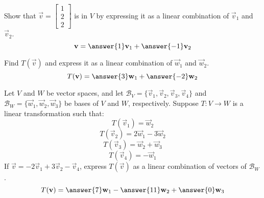 \documentclass{ximera}
\begin{document}
\begin{problem}
  \begin{problem}\label{prob:lintransandbasis2}
  Show that $\vec{v}=\begin{bmatrix}1\\2\\2\end{bmatrix}$ is in $V$ by expressing it as a linear combination of $\vec{v}_1$ and $\vec{v}_2$.
  $$\vec{v}=\answer{1}\vec{v}_1+\answer{-1}\vec{v}_2$$
  \end{problem}
  
  \begin{problem}\label{prob:lintransandbasis3}
  Find $T(\vec{v})$ and express it as a linear combination of $\vec{w}_1$ and $\vec{w}_2$.
  $$T(\vec{v})=\answer{3}\vec{w}_1+\answer{-2}\vec{w}_2$$
  \end{problem}
  \end{problem}


\begin{problem}\label{prob:lintransandbasis4} Let $V$ and $W$ be vector spaces, and let $\mathcal{B}_V=\{\vec{v}_1, \vec{v}_2, \vec{v}_3, \vec{v}_4\}$ and $\mathcal{B}_W=\{\vec{w}_1,\vec{w}_2, \vec{w}_3\}$ be bases of $V$ and $W$, respectively.  Suppose $T:V\rightarrow W$ is a linear transformation such that: $$T(\vec{v}_1)=\vec{w}_2$$ $$T(\vec{v}_2)=2\vec{w}_1-3\vec{w}_2$$
$$T(\vec{v}_3)=\vec{w}_2+\vec{w}_3$$
$$T(\vec{v}_4)=-\vec{w}_1$$
If $\vec{v}=-2\vec{v}_1+3\vec{v}_2-\vec{v}_4$, express $T(\vec{v})$ as a linear combination of vectors of $\mathcal{B}_W$.
$$T(\vec{v})=\answer{7}\vec{w}_1-\answer{11}\vec{w}_2+\answer{0}\vec{w}_3$$
\end{problem}
\end{document}
